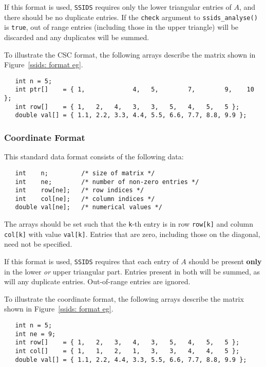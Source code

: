 If this format is used, \texttt{SSIDS} requires only the lower triangular entries of $A$, and there 
should be no duplicate entries. If the \texttt{check}
argument to
\texttt{ssids\_analyse()} is \texttt{true}, out of range entries (including
those in the upper triangle) will be discarded and any duplicates will be
summed.

To illustrate the CSC format, the following arrays describe the matrix shown in
Figure~\ref{ssids: format eg}.
\begin{verbatim}
   int n = 5;
   int ptr[]    = { 1,             4,   5,        7,        9,    10 };
   int row[]    = { 1,   2,   4,   3,   3,   5,   4,   5,   5 };
   double val[] = { 1.1, 2.2, 3.3, 4.4, 5.5, 6.6, 7.7, 8.8, 9.9 };
\end{verbatim}

\subsubsection{Coordinate Format} \label{ssids: coordformat}
This standard data format consists of the following data:
\begin{verbatim}
   int    n;         /* size of matrix */
   int    ne;        /* number of non-zero entries */
   int    row[ne];   /* row indices */
   int    col[ne];   /* column indices */
   double val[ne];   /* numerical values */
\end{verbatim}
The arrays should be set such that the \texttt{k}-th entry is in row
\texttt{row[k]} and column \texttt{col[k]} with value \texttt{val[k]}.
Entries that are zero, including those on the diagonal, need not be specified.

If this format is used,
\texttt{SSIDS} requires that each entry of $A$ should be present \textbf{only} in the
lower \textit{or} upper triangular part. Entries present in both will be summed, as
will any duplicate entries. Out-of-range entries are ignored.

To illustrate the coordinate format, the following arrays describe the matrix shown in
Figure~\ref{ssids: format eg}.
\begin{verbatim}
   int n = 5;
   int ne = 9;
   int row[]    = { 1,   2,   3,   4,   3,   5,   4,   5,   5 };
   int col[]    = { 1,   1,   2,   1,   3,   3,   4,   4,   5 };
   double val[] = { 1.1, 2.2, 4.4, 3.3, 5.5, 6.6, 7.7, 8.8, 9.9 };
\end{verbatim}


